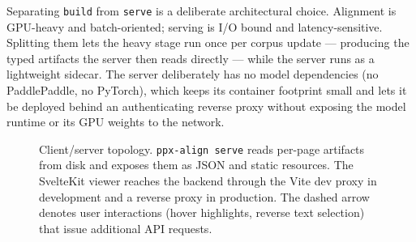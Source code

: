 \documentclass{article}
\theoremstyle{definition}
\begin{document}
Separating \texttt{build} from \texttt{serve} is a deliberate
architectural choice.  Alignment is GPU-heavy and batch-oriented;
serving is I/O bound and latency-sensitive.  Splitting them lets
the heavy stage run once per corpus update --- producing the typed
artifacts the server then reads directly --- while the server runs
as a lightweight sidecar.  The server deliberately has no model
dependencies (no PaddlePaddle, no PyTorch), which keeps its
container footprint small and lets it be deployed behind an
authenticating reverse proxy without exposing the model runtime or
its GPU weights to the network.

\begin{figure}[h]
      \centering
      \caption{Client/server topology.  \texttt{ppx-align serve} reads
            per-page artifacts from disk and exposes them as JSON and static
            resources.  The SvelteKit viewer reaches the backend through the
            Vite dev proxy in development and a reverse proxy in production.
            The dashed arrow denotes user interactions (hover highlights,
            reverse text selection) that issue additional API requests.}
      \label{fig:clientserver}
\end{figure}
\end{document}
